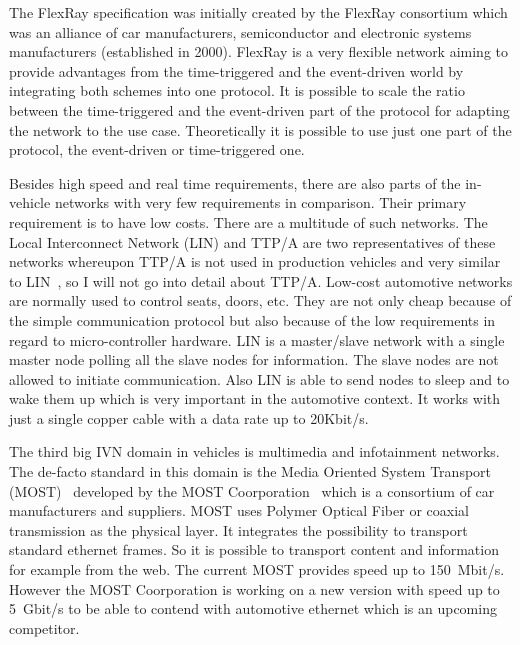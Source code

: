 The FlexRay specification was initially created by the FlexRay consortium which
was an alliance of car manufacturers, semiconductor and electronic systems
manufacturers (established in 2000). FlexRay is a very flexible network aiming
to provide advantages from the time-triggered and the event-driven world by
integrating both schemes into one protocol. It is possible to scale the ratio
between the time-triggered and the event-driven part of the protocol for
adapting the network to the use case. Theoretically it is possible to use just
one part of the protocol, the event-driven or time-triggered one.

Besides high speed and real time requirements, there are also parts of the
in-vehicle networks with very few requirements in comparison. Their primary
requirement is to have low costs. There are a multitude of such networks. The
Local Interconnect Network (LIN) and TTP/A are two representatives of these
networks whereupon TTP/A is not used in production vehicles and
very similar to LIN~\cite{Navet2017}, so I will not go into detail about TTP/A. Low-cost
automotive networks are normally used to control seats, doors, etc. They are not
only cheap because of the simple communication protocol but also because of the
low requirements in regard to micro-controller hardware. LIN is a master/slave
network with a single master node polling all the slave nodes for information.
The slave nodes are not allowed to initiate communication. Also LIN is able to
send nodes to sleep and to wake them up which is very important in the
automotive context. It works with just a single copper cable with a data rate up to 20Kbit/s.

The third big IVN domain in vehicles is multimedia and infotainment networks.
The de-facto standard in this domain is the Media Oriented System Transport
(MOST)~\cite{Navet2017} developed by the MOST Coorporation~\cite{MOST2018} which
is a consortium of car manufacturers and suppliers. MOST uses Polymer Optical
Fiber or coaxial transmission as the physical layer. It integrates the
possibility to transport standard ethernet frames. So it is possible to
transport content and information for example from the web. The current MOST
provides speed up to 150~Mbit/s. However the MOST Coorporation is working on a new version with speed up to 5~Gbit/s to be able to contend with automotive ethernet which is an upcoming competitor.

